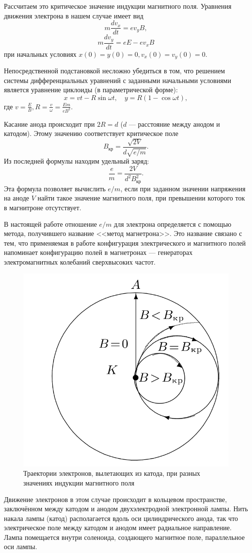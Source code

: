 \documentclass[a4paper, fontsize=14pt]{article}
\begin{document}
Рассчитаем это критическое значение индукции магнитного поля. Уравнения движения электрона в нашем случае имеет вид
\[
	m \frac{d v_x}{d t} = e v_y B,
\]
\[
	m \frac{d v_y}{d t} = e E - e v_x B
\]
при начальных условиях $x(0) = y(0) = 0, v_x(0) = v_y (0) = 0$.

Непосредственной подстановкой несложно убедиться в том, что решением системы дифференциальных уравнений с заданными начальными условиями является уравнение циклоиды (в параметрической форме):
\[
	x = v t - R \sin \omega t, \quad y = R(1 - \cos \omega t),
\]
где $v = \frac{E}{B}, R = \frac{v}{\omega} = \frac{E m}{e B^2}$.

Касание анода происходит при $2R = d$ ($d$ --- расстояние между анодом и катодом). Этому значению соответствует критическое поле
\[
	B_\text{кр} = \frac{\sqrt{2V}}{d \sqrt{e / m}}.
\]
Из последней формулы находим удельный заряд:
\[
	\frac{e}{m} = \frac{2V}{d^2 B_\text{кр}^2}.
\]
Эта формула позволяет вычислить $e / m$, если при заданном значении напряжения на аноде $V$ найти такое значение магнитного поля, при превышении которого ток в магнитроне отсутствует.

В настоящей работе отношение $e / m$ для электрона определяется с помощью метода, получившего название <<метод магнетрона>>. Это название связано с тем, что применяемая в работе конфигурация электрического и магнитного полей напоминает конфигурацию полей в магнетронах --- генераторах электромагнитных колебаний сверхвысоких частот.
\begin{figure}[H]
\center
\includegraphics[scale=0.4]{tr.png}
\caption{Траектории электронов, вылетающих из катода, при разных значениях индукции магнитного поля}
\end{figure}
Движение электронов в этом случае происходит в кольцевом пространстве, заключённом между катодом и анодом двухэлектродной электронной лампы. Нить накала лампы (катод) располагается вдоль оси цилиндрического анода, так что электрическое поле между катодом и анодом имеет радиальное направление. Лампа помещается внутри соленоида, создающего магнитное поле, параллельное оси лампы.
\end{document}
